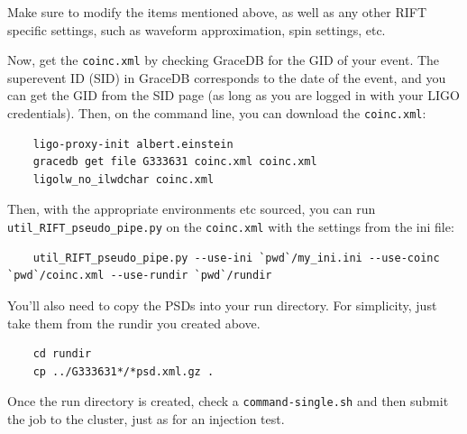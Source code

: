\documentclass{article}
\begin{document}

Make sure to modify the items mentioned above, as well as any other RIFT specific settings, such as waveform approximation, spin settings, etc. 

\newpage
Now, get the \texttt{coinc.xml} by checking GraceDB for the GID of your event. The superevent ID (SID) in GraceDB corresponds to the date of the event, and you can get the GID from the SID page (as long as you are logged in with your LIGO credentials). Then, on the command line, you can download the \texttt{coinc.xml}:

\begin{verbatim}
    ligo-proxy-init albert.einstein
    gracedb get file G333631 coinc.xml coinc.xml
    ligolw_no_ilwdchar coinc.xml
\end{verbatim}

Then, with the appropriate environments etc sourced, you can run \texttt{util\_RIFT\_pseudo\_pipe.py} on the \texttt{coinc.xml} with the settings from the ini file:

\begin{verbatim}
    util_RIFT_pseudo_pipe.py --use-ini `pwd`/my_ini.ini --use-coinc `pwd`/coinc.xml --use-rundir `pwd`/rundir
\end{verbatim}

You'll also need to copy the PSDs into your run directory. For simplicity, just take them from the rundir you created above.

\begin{verbatim}
    cd rundir
    cp ../G333631*/*psd.xml.gz .
\end{verbatim}

Once the run directory is created, check a \texttt{command-single.sh} and then submit the job to the cluster, just as for an injection test.
\end{document}
